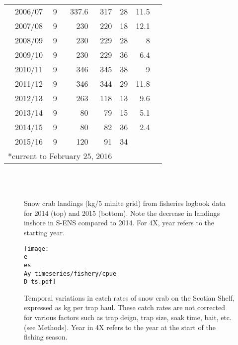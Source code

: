 \documentclass[paper=a4, fontsize=11pt]{article}
\newcommand{\D}{.}
\newcommand{\e}{/home/michelle/ecomod_data/}
\newcommand{\es}{snowcrab/}
\newcommand{\Ay}{assessments/2015/}
\begin{document}
\begin{table}[h]
\begin{center}
\begin{tabular}{rrrrrrr}
2006/07 &   9 & 337.6 & 317 & 28 & 11.5 \\ 
2007/08 &   9 & 230 & 220 & 18 & 12.1 \\ 
2008/09 &   9 & 230 & 229 & 28 & 8 \\ 
2009/10 &   9 & 230 & 229 & 36 & 6.4 \\ 
2010/11 &   9 & 346 & 345 & 38 & 9 \\ 
2011/12 &   9 & 346 & 344 & 29 & 11.8 \\ 
2012/13 &   9 & 263 & 118 & 13 & 9.6 \\ 
2013/14 &   9 & 80 &  79 & 15 & 5.1 \\ 
2014/15 &   9 & 80 &  82 & 36 & 2.4 \\ 
2015/16 &   9& 120 &  91 & 34 &  \\ 
   \hline
   \multicolumn{4}{c}{*current to February 25, 2016}
  \end{tabular}
  \end{center}
\end{table}



\begin{figure}[h]
	\centering
	\\
	\\
	\caption{Snow crab landings (kg/5 minite grid) from fisheries logbook data for 2014 (top) and 2015 (bottom). Note the decrease in landings inshore in S-ENS compared to 2014. For 4X, year refers to the starting year.}
\end{figure}
\begin{figure}[h]
    \centering
    \texttt{[image: \\e \\es \\Ay timeseries/fishery/cpue\\D ts.pdf]}
    \caption{Temporal variations in catch rates of snow crab on the Scotian Shelf, expressed as kg per trap haul. These catch rates are not corrected for various factors such as trap deign, trap size, soak time, bait, etc. (see Methods). Year in 4X refers to the year at the start of the fishing season.}
\end{figure}
\end{document}
